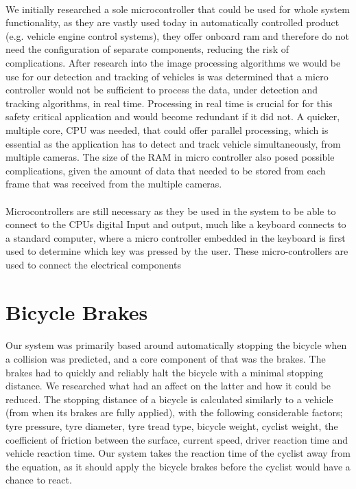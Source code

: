 \documentclass[a4paper]{report}
\begin{document}
\paragraph{}We initially researched a sole microcontroller that could be used for whole system functionality, as they are vastly used today in automatically controlled product (e.g. vehicle engine control systems), they offer onboard ram and therefore do not need the configuration of separate components, reducing the risk of complications.  After research into the image processing algorithms we would be use for our detection and tracking of vehicles is was determined that a micro controller would not be sufficient to process the data, under detection and tracking algorithms, in real time. Processing in real time is crucial for for this safety critical application and would become redundant if it did not. A quicker, multiple core, CPU was needed, that could offer parallel processing, which is essential as the application has to detect and track vehicle simultaneously, from multiple cameras. The size of the RAM in micro controller also posed possible complications, given the amount of data that needed to be stored from each frame that was received from the multiple cameras.

\paragraph{}Microcontrollers are still necessary as they be used in the system to be able to connect to the CPUs digital Input and output, much like a keyboard connects to a standard computer, where a micro controller embedded in the keyboard is first used to determine which key was pressed by the user. These micro-controllers are used to connect the electrical components 

\section{Bicycle Brakes}

\paragraph{}Our system was primarily based around automatically stopping the bicycle when a collision was predicted, and a core component of that was the brakes. The brakes had to quickly and reliably halt the bicycle with a minimal stopping distance. We researched what had an affect on the latter and how it could be reduced. The stopping distance of a bicycle is calculated similarly to a vehicle (from when its brakes are fully applied), with the following considerable factors; tyre pressure, tyre diameter, tyre tread type, bicycle weight, cyclist weight, the coefficient of friction between the surface, current speed, driver reaction time and vehicle reaction time. Our system takes the reaction time of the cyclist away from the equation, as it should apply the bicycle brakes before the cyclist would have a chance to react. 
\end{document}
